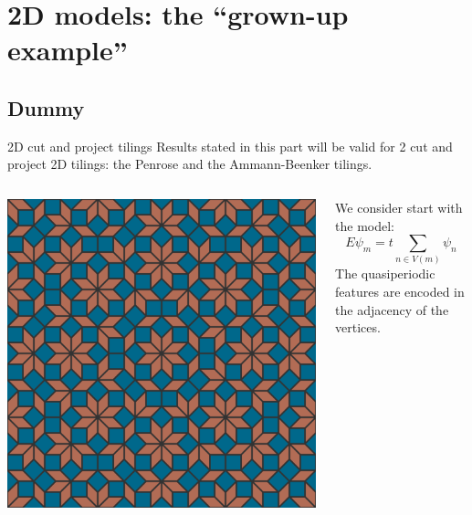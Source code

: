 \documentclass[xcolor=x11names,compress,professionalfonts]{beamer}
\renewcommand{\(}{\begin{columns}}
\renewcommand{\)}{\end{columns}}
\newcommand{\<}[1]{\begin{column}{#1}}
\renewcommand{\>}{\end{column}}
\begin{document}
\section{2D models: the ``grown-up example''}
\subsection{Dummy}

\begin{frame}{2D cut and project tilings}
Results stated in this part will be valid for 2 cut and project 2D tilings: the Penrose and the Ammann-Beenker tilings.
\begin{columns}
\begin{column}{5cm}
{\centering
\includegraphics[scale=.1]{img/ammann-beenker.png}

}
\end{column}
\begin{column}{5cm}
We consider start with the model:
\[
	E \psi_m = t\sum_{n \in V(m)} \psi_n
\]
The quasiperiodic features are encoded in the adjacency of the vertices.
\end{column}
\end{columns}
\end{frame}
\end{document}
